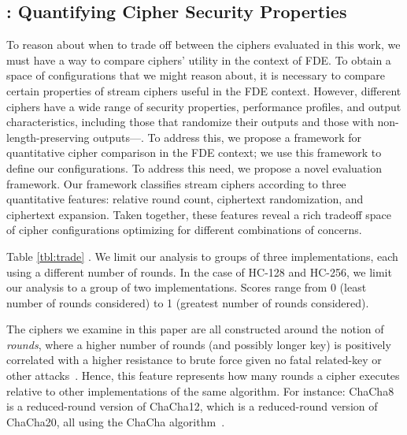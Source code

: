 \subsection{\sysC: Quantifying Cipher Security
Properties}\label{subsec:des-trade}

To reason about when to trade off between the ciphers evaluated in this work, we
must have a way to compare ciphers' utility in the context of \sys FDE. To
obtain a space of configurations that we might reason about, it is necessary to
compare certain properties of stream ciphers useful in the FDE context. However,
different ciphers have a wide range of security properties, performance
profiles, and output characteristics, including those that randomize their
outputs and those with non-length-preserving outputs---. To address this, we propose a framework for
quantitative cipher comparison in the FDE context; we use this framework to
define our configurations.  To
address this need, we propose a novel evaluation framework. Our framework
classifies stream ciphers according to three quantitative features: relative
round count, ciphertext randomization, and ciphertext expansion. Taken together,
these features reveal a rich tradeoff space of cipher configurations optimizing
for different combinations of concerns.

Table \cref{tbl:trade} . We limit our analysis to groups of
three implementations, each using a different number of rounds. In the case of
HC-128 and HC-256, we limit our analysis to a group of two implementations.
Scores range from 0 (least number of rounds considered) to 1 (greatest number of
rounds considered).




 The ciphers we examine in this paper are all
constructed around the notion of \emph{rounds}, where a higher number of rounds
(and possibly longer key) is positively correlated with a higher resistance to
brute force given no fatal related-key or other
attacks~\cite{ChaCha-Cryptanalysis}. Hence, this feature represents how many
rounds a cipher executes relative to other implementations of the same
algorithm. For instance: ChaCha8 is a reduced-round version of ChaCha12, which
is a reduced-round version of ChaCha20, all using the ChaCha
algorithm~\cite{ChaCha20,ChaCha-Cryptanalysis}.

